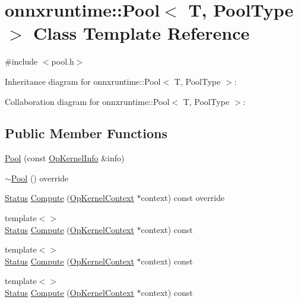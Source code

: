 \hypertarget{classonnxruntime_1_1Pool}{}\section{onnxruntime\+:\+:Pool$<$ T, Pool\+Type $>$ Class Template Reference}
\label{classonnxruntime_1_1Pool}


{\ttfamily \#include $<$pool.\+h$>$}



Inheritance diagram for onnxruntime\+:\+:Pool$<$ T, Pool\+Type $>$\+:


Collaboration diagram for onnxruntime\+:\+:Pool$<$ T, Pool\+Type $>$\+:
\subsection*{Public Member Functions}
\begin{DoxyCompactItemize}
\item 
\mbox{\hyperlink{classonnxruntime_1_1Pool_acac53fc4ac4307d7b3bcd162015efcb4}{Pool}} (const \mbox{\hyperlink{classonnxruntime_1_1OpKernelInfo}{Op\+Kernel\+Info}} \&info)
\item 
\mbox{\hyperlink{classonnxruntime_1_1Pool_a66cabaed967e0f1f6f5e716d3100ca44}{$\sim$\+Pool}} () override
\item 
\mbox{\hyperlink{classonnxruntime_1_1common_1_1Status}{Status}} \mbox{\hyperlink{classonnxruntime_1_1Pool_afc168d47c3d4a0a67c40bd3e14bd1431}{Compute}} (\mbox{\hyperlink{classonnxruntime_1_1OpKernelContext}{Op\+Kernel\+Context}} $\ast$context) const override
\item 
{\footnotesize template$<$$>$ }\\\mbox{\hyperlink{classonnxruntime_1_1common_1_1Status}{Status}} \mbox{\hyperlink{classonnxruntime_1_1Pool_a22de9b978800e6bf5b9bc94e8beef55f}{Compute}} (\mbox{\hyperlink{classonnxruntime_1_1OpKernelContext}{Op\+Kernel\+Context}} $\ast$context) const
\item 
{\footnotesize template$<$$>$ }\\\mbox{\hyperlink{classonnxruntime_1_1common_1_1Status}{Status}} \mbox{\hyperlink{classonnxruntime_1_1Pool_a7c4951dbf40c8a96595a33846f6def61}{Compute}} (\mbox{\hyperlink{classonnxruntime_1_1OpKernelContext}{Op\+Kernel\+Context}} $\ast$context) const
\item 
{\footnotesize template$<$$>$ }\\\mbox{\hyperlink{classonnxruntime_1_1common_1_1Status}{Status}} \mbox{\hyperlink{classonnxruntime_1_1Pool_a10f34e111b6792c1e543610c4c91765e}{Compute}} (\mbox{\hyperlink{classonnxruntime_1_1OpKernelContext}{Op\+Kernel\+Context}} $\ast$context) const
\end{DoxyCompactItemize}
